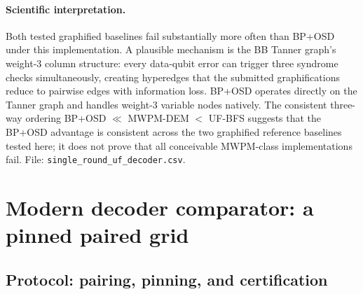 \documentclass[11pt,a4paper]{article}
\begin{document}
\paragraph{Scientific interpretation.}
Both tested graphified baselines fail substantially more often than BP+OSD under this implementation.
A plausible mechanism is the BB Tanner graph's weight-3 column structure: every data-qubit error can trigger three syndrome checks simultaneously, creating hyperedges that the submitted graphifications reduce to pairwise edges with information loss.
BP+OSD operates directly on the Tanner graph and handles weight-3
variable nodes natively.
The consistent three-way ordering BP+OSD $\ll$ MWPM-DEM $<$ UF-BFS
suggests that the BP+OSD advantage is consistent across the two graphified
reference baselines tested here; it does not prove that all conceivable
MWPM-class implementations fail.
File: \texttt{single\_round\_uf\_decoder.csv}.

\section{Modern decoder comparator: a pinned paired grid}
\label{sec:comparator}

\subsection{Protocol: pairing, pinning, and certification}
\end{document}
